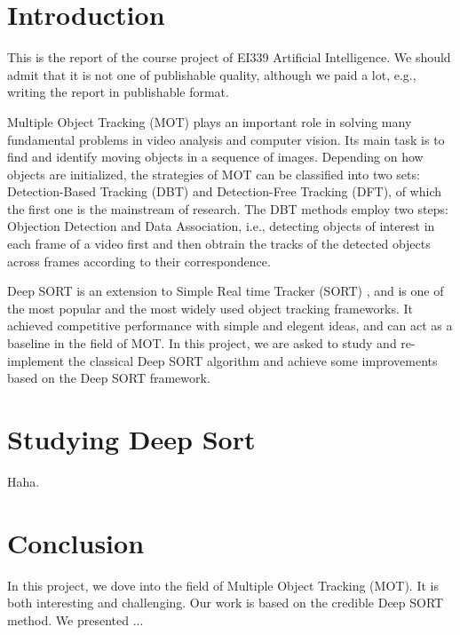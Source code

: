 \documentclass[conference]{IEEEtran}
\begin{document}



\section{Introduction}

This is the report of the course project of EI339 Artificial Intelligence. We should admit that it is not one of publishable quality, although we paid a lot, e.g., writing the report in publishable format.

Multiple Object Tracking (MOT) plays an important role in solving many fundamental problems in video analysis and
computer vision. Its main task is to find and identify moving objects in a sequence of images. Depending on how objects are initialized, the strategies of MOT can be classified into two sets: Detection-Based Tracking (DBT) and Detection-Free Tracking (DFT), of which the first one is the mainstream of research. The DBT methods employ two steps: Objection Detection and Data Association, i.e., detecting objects of interest in each frame of a video first and then obtrain the tracks of the detected objects across frames according to their correspondence. 

Deep SORT \cite{Wojke2017simple} is an extension to Simple Real time Tracker (SORT) \cite{Bewley2016_sort}, and is one of the most popular and the most widely used object tracking frameworks. It achieved competitive performance with simple and elegent ideas, and can act as a baseline in the field of MOT. In this project, we are asked to study and re-implement the classical Deep SORT algorithm and achieve some improvements based on the Deep SORT framework.

\section{Studying Deep Sort}

Haha.



\section{Conclusion}

In this project, we dove into the field of Multiple Object Tracking (MOT). It is both interesting and challenging. Our work is based on the credible Deep SORT method. We presented ... 



\end{document}
